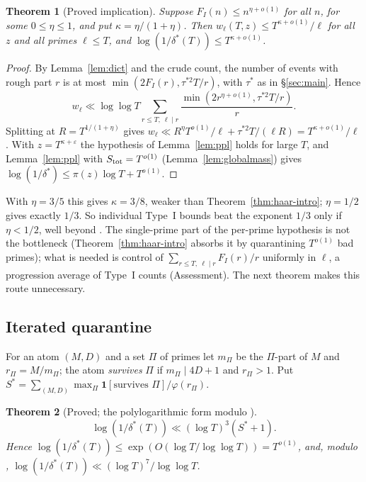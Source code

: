 \documentclass[11pt,reqno]{amsart}
\newtheorem{theorem}{Theorem}[section]
\theoremstyle{definition}
\begin{document}
\begin{theorem}[Proved implication]\label{thm:eta}
Suppose $F_I(n)\le n^{\eta+o(1)}$ for all $n$, for some $0\le\eta\le1$, and put
$\kappa=\eta/(1+\eta)$.  Then $w_\ell(T,z)\le T^{\kappa+o(1)}/\ell$ for all $z$ and
all primes $\ell\le T$, and $\log(1/\delta^*(T))\le T^{\kappa+o(1)}$.
\end{theorem}

\begin{proof}
By Lemma~\ref{lem:dict} and the crude count, the number of events with rough
part $r$ is at most $\min(2F_I(r),\tau^{*2}T/r)$, with $\tau^*$ as in
\S\ref{sec:main}.  Hence
\[
 w_\ell\ll\log\log T\sum_{r\le T,\ \ell\mid r}\frac{\min(2r^{\eta+o(1)},\tau^{*2}T/r)}r .
\]
Splitting at $R=T^{1/(1+\eta)}$ gives
$w_\ell\ll R^{\eta}T^{o(1)}/\ell+\tau^{*2}T/(\ell R)=T^{\kappa+o(1)}/\ell$.  With
$z=T^{\kappa+\varepsilon}$ the hypothesis of Lemma~\ref{lem:ppl} holds for large $T$,
and Lemma~\ref{lem:ppl} with $S_{\rm tot}=T^{o(1)}$ (Lemma~\ref{lem:globalmass}) gives $\log(1/\delta^*)\le\pi(z)\log T+T^{o(1)}$.
\end{proof}

With $\eta=3/5$ this gives $\kappa=3/8$, weaker than
Theorem~\ref{thm:haar-intro}; $\eta=1/2$ gives exactly $1/3$.  So individual
Type~I bounds beat the exponent $1/3$ only if $\eta<1/2$, well beyond
\cite[Prop.~1.7]{ET}.  The single-prime part of the per-prime hypothesis is
not the bottleneck (Theorem~\ref{thm:haar-intro} absorbs it by quarantining
$T^{o(1)}$ bad primes); what is needed is control of
$\sum_{r\le T,\ \ell\mid r}F_I(r)/r$ uniformly in $\ell$, a progression average of
Type~I counts (Assessment).  The next theorem makes this route unnecessary.

\subsection*{Iterated quarantine}
For an atom $(M,D)$ and a set $\Pi$ of primes let $m_\Pi$ be the $\Pi$-part of $M$
and $r_\Pi=M/m_\Pi$; the atom \emph{survives} $\Pi$ if $m_\Pi\mid4D+1$ and $r_\Pi>1$.
Put $S^*=\sum_{(M,D)}\max_\Pi\mathbf 1[\text{survives }\Pi]/\varphi(r_\Pi)$.

\begin{theorem}[Proved; the polylogarithmic form modulo {\cite[Prop.~1.4]{ET}}]\label{thm:iterq}
\[
 \log(1/\delta^*(T))\ll(\log T)^3(S^*+1).
\]
Hence $\log(1/\delta^*(T))\le\exp(O(\log T/\log\log T))=T^{o(1)}$, and, modulo
\cite[Prop.~1.4]{ET}, $\log(1/\delta^*(T))\ll(\log T)^7/\log\log T$.
\end{theorem}
\end{document}
